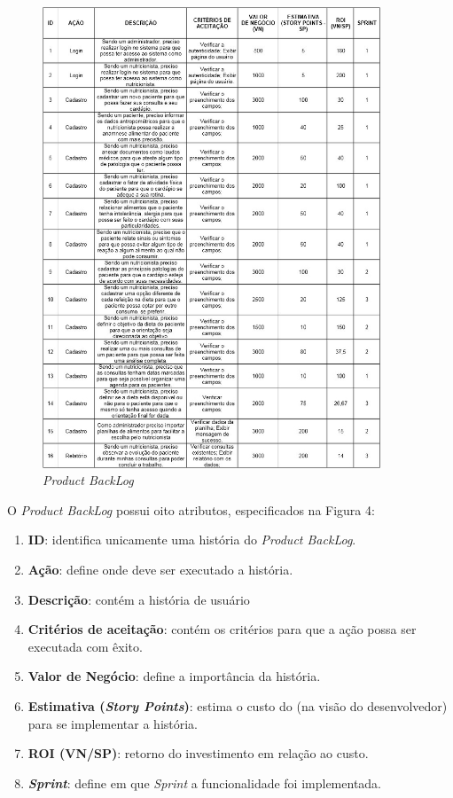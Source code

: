 \documentclass[
	12pt,				%
    oneside,			%
	a4paper,			%
	english,			%
	french,				%
	spanish,			%
	brazil,				%
	]{abntex2}
\begin{document}
\begin{figure} [hbt] 
\begin{center}
\includegraphics[width=0.90\textwidth]{table.jpg}
\end{center}
\label{table1} 
\caption{\textit{Product BackLog}}
\end{figure}

O \textit{Product BackLog} possui oito atributos, especificados na Figura 4: %

\begin{enumerate}

\item \textbf{ID}: identifica unicamente uma história do \textit{Product BackLog}.
\item \textbf{Ação}: define onde deve ser executado a história.
\item \textbf{Descrição}: contém a história de usuário
\item \textbf{Critérios de aceitação}: contém os critérios para que a ação possa ser
executada com êxito.
\item \textbf{Valor de Negócio}: define a importância da história.
\item \textbf{Estimativa (\textit{Story Points})}: estima o custo do (na visão do desenvolvedor)
para se implementar a história.
\item \textbf{ROI (VN/SP)}: retorno do investimento em relação ao custo.
\item \textbf{\textit{Sprint}}: define em que \textit{Sprint} a funcionalidade foi implementada.

\end{enumerate}
\end{document}
